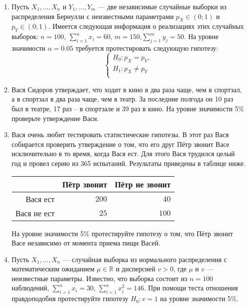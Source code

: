 \begin{enumerate}
\item Пусть $X_{1}, \ldots, X_{n}$ и $Y_{1}, \ldots, Y_{m}$ —
две независимые случайные выборки из распределения Бернулли с неизвестными параметрами
$p_{X} \in (0; 1)$ и $p_{Y} \in (0; 1)$.
Имеется следующая информация о реализациях этих случайных выборок: $n = 100$,
$\sum_{i=1}^{n} x_{i} = 60$, $m = 150$,$\sum_{j=1}^{m} y_{j} = 50$.
На уровне значимости $\alpha = 0.05$ требуется протестировать следующую гипотезу:
\[\begin{cases}
H_{0}:p_{X} = p_{Y}, \\
H_{1}:p_{X} \neq p_{Y} \\
\end{cases}\]

\item Вася Сидоров утверждает, что ходит в кино в два раза чаще, чем в спортзал,
а в спортзал в два раза чаще, чем в театр.
За последние полгода он 10 раз был в театре, 17 раз – в спортзале и 39 раз в кино.
На уровне значимости 5\% проверьте утверждение Васи.

\item Вася очень любит тестировать статистические гипотезы.
В этот раз Вася собирается проверить утверждение о том,
что его друг Пётр звонит Васе исключительно в то время, когда Вася ест.
Для этого Вася трудился целый год и провел серию из 365 испытаний.
Результаты приведены в таблице ниже.

\begin{center}\begin{tabular}{r|rr}
\toprule
   & Пётр звонит   & Пётр не звонит  \\ \midrule
Вася ест           & $200$ & $40$ \\
 Вася не ест       & $25$ & $100$  \\ \bottomrule
\end{tabular}\end{center}

На уровне значимости 5\% протестируйте гипотезу о том, что Пётр звонит Васе
независимо от момента приема пищи Васей.

\item Пусть $X_{1}, \ldots, X_{n}$ — случайная выборка из нормального распределения
с математическим ожиданием $\mu \in \mathbb{R}$ и дисперсией $v > 0$,
где $\mu$ и $v$ — неизвестные параметры.
Известно, что выборка состоит из $n = 100$ наблюдений,
$\sum_{i=1}^{n} x_{i} = 30$, $\sum_{i=1}^{n} x^2_{i} = 146$.
При помощи теста отношения правдоподобия протестируйте гипотезу $H_{0}:v = 1$
на уровне значимости 5\%.

\end{enumerate}
